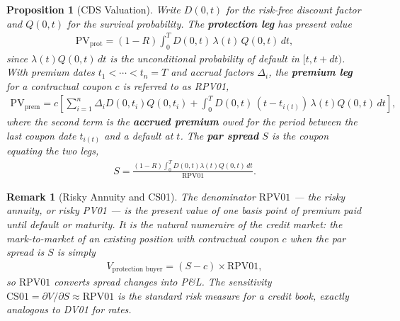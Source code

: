 \documentclass{report}
\theoremstyle{spacedplain}
\newtheorem{proposition}[theorem]{Proposition}
\theoremstyle{spaceddefinition}
\theoremstyle{spacedremark}
\newtheorem{remark}[theorem]{Remark}
\begin{document}
\begin{proposition}[CDS Valuation]
    Write $D(0,t)$ for the risk-free discount factor and $Q(0,t)$ for the survival probability. The \textbf{protection leg} has present value
    \begin{align}
        \mathrm{PV}_{\mathrm{prot}} = (1-R)\int_0^T D(0,t)\,\lambda(t)\,Q(0,t)\,dt,
    \end{align}
    since $\lambda(t)Q(0,t)\,dt$ is the unconditional probability of default in $[t,t+dt)$. With premium dates $t_1<\cdots<t_n=T$ and accrual factors $\Delta_i$, the \textbf{premium leg} for a contractual coupon $c$ is referred to as RPV01,
    \begin{align}
        \mathrm{PV}_{\mathrm{prem}} = c\left[\sum_{i=1}^n \Delta_i D(0,t_i)Q(0,t_i) + \int_0^T D(0,t)\,(t-t_{i(t)})\,\lambda(t)Q(0,t)\,dt\right],
    \end{align}
    where the second term is the \textbf{accrued premium} owed for the period between the last coupon date $t_{i(t)}$ and a default at $t$. The \textbf{par spread} $S$ is the coupon equating the two legs,
    \begin{align}
        S = \frac{(1-R)\int_0^T D(0,t)\lambda(t)Q(0,t)\,dt}{\mathrm{RPV01}}.
    \end{align}
\end{proposition}

\begin{remark}[Risky Annuity and CS01]
    The denominator $\mathrm{RPV01}$ --- the \emph{risky annuity}, or risky PV01 --- is the present value of one basis point of premium paid until default or maturity. It is the natural numeraire of the credit market: the mark-to-market of an existing position with contractual coupon $c$ when the par spread is $S$ is simply
    \begin{align}
        V_{\text{protection buyer}} = (S - c)\times \mathrm{RPV01},
    \end{align}
    so $\mathrm{RPV01}$ converts spread changes into P\&L. The sensitivity $\mathrm{CS01} = \partial V/\partial S \approx \mathrm{RPV01}$ is the standard risk measure for a credit book, exactly analogous to DV01 for rates.
\end{remark}
\end{document}

